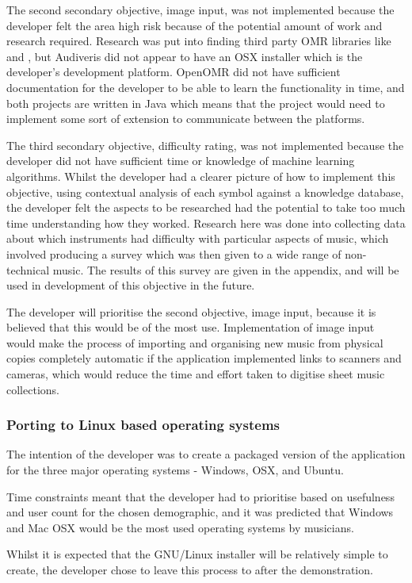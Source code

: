 The second secondary objective, image input, was not implemented because the developer felt the area high risk because of the potential amount of work and research required. Research was put into finding third party OMR libraries like \cite{audiveris} and \cite{openomr}, but Audiveris did not appear to have an OSX installer which is the developer's development platform. OpenOMR did not have sufficient documentation for the developer to be able to learn the functionality in time, and both projects are written in Java which means that the project would need to implement some sort of extension to communicate between the platforms.

The third secondary objective, difficulty rating, was not implemented because the developer did not have sufficient time or knowledge of machine learning algorithms. Whilst the developer had a clearer picture of how to implement this objective, using contextual analysis of each symbol against a knowledge database, the developer felt the aspects to be researched had the potential to take too much time understanding how they worked. Research here was done into collecting data about which instruments had difficulty with particular aspects of music, which involved producing a survey which was then given to a wide range of non-technical music. The results of this survey are given in the appendix, and will be used in development of this objective in the future.

The developer will prioritise the second objective, image input, because it is believed that this would be of the most use. Implementation of image input would make the process of importing and organising new music from physical copies completely automatic if the application implemented links to scanners and cameras, which would reduce the time and effort taken to digitise sheet music collections.

\subsubsection{Porting to Linux based operating systems}
The intention of the developer was to create a packaged version of the application for the three major operating systems - Windows, OSX, and Ubuntu. 

Time constraints meant that the developer had to prioritise based on usefulness and user count for the chosen demographic, and it was predicted that Windows and Mac OSX would be the most used operating systems by musicians.

Whilst it is expected that the GNU/Linux installer will be relatively simple to create, the developer chose to leave this process to after the demonstration.


